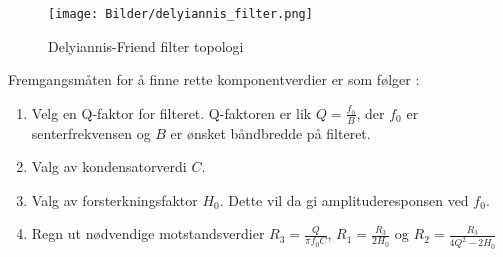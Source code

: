 \begin{figure}[H]
    \centering
    \texttt{[image: Bilder/delyiannis\_filter.png]}
    \caption{Delyiannis-Friend filter topologi \cite{teknisk_notat}}
    \label{fig:delyiannis_filter_circuit}
\end{figure}

Fremgangsmåten for å finne rette komponentverdier er som følger \cite{delyiannis}:
\begin{enumerate}
    \item Velg en Q-faktor for filteret. Q-faktoren er lik $Q = \frac{f_0}{B}$, der $f_0$ er senterfrekvensen og $B$ er ønsket båndbredde på filteret.
    \item Valg av kondensatorverdi $C$.
    \item Valg av forsterkningsfaktor $H_0$. Dette vil da gi amplituderesponsen ved $f_0$.
    \item Regn ut nødvendige motstandsverdier $R_3 = \frac{Q}{\pi f_0 C}$, $R_1 = \frac{R_3}{2H_0}$ og $R_2 = \frac{R_3}{4Q^2 - 2H_0}$
\end{enumerate}
